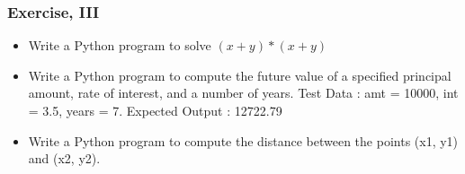 \begin{frame}[fragile]\frametitle{Exercise, III}
\begin{itemize}
\item Write a Python program to solve $(x + y) * (x + y)$
\item Write a Python program to compute the future value of a specified principal amount, rate of interest, and a number of years.  Test Data : amt = 10000, int = 3.5, years = 7.
Expected Output : 12722.79
\item Write a Python program to compute the distance between the points (x1, y1) and (x2, y2).
\end{itemize}
\end{frame}
